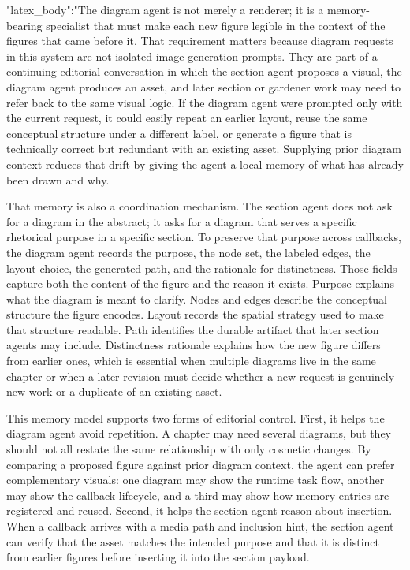 {"latex_body":"The diagram agent is not merely a renderer; it is a memory-bearing specialist that must make each new figure legible in the context of the figures that came before it. That requirement matters because diagram requests in this system are not isolated image-generation prompts. They are part of a continuing editorial conversation in which the section agent proposes a visual, the diagram agent produces an asset, and later section or gardener work may need to refer back to the same visual logic. If the diagram agent were prompted only with the current request, it could easily repeat an earlier layout, reuse the same conceptual structure under a different label, or generate a figure that is technically correct but redundant with an existing asset. Supplying prior diagram context reduces that drift by giving the agent a local memory of what has already been drawn and why.

That memory is also a coordination mechanism. The section agent does not ask for a diagram in the abstract; it asks for a diagram that serves a specific rhetorical purpose in a specific section. To preserve that purpose across callbacks, the diagram agent records the purpose, the node set, the labeled edges, the layout choice, the generated path, and the rationale for distinctness. Those fields capture both the content of the figure and the reason it exists. Purpose explains what the diagram is meant to clarify. Nodes and edges describe the conceptual structure the figure encodes. Layout records the spatial strategy used to make that structure readable. Path identifies the durable artifact that later section agents may include. Distinctness rationale explains how the new figure differs from earlier ones, which is essential when multiple diagrams live in the same chapter or when a later revision must decide whether a new request is genuinely new work or a duplicate of an existing asset.

This memory model supports two forms of editorial control. First, it helps the diagram agent avoid repetition. A chapter may need several diagrams, but they should not all restate the same relationship with only cosmetic changes. By comparing a proposed figure against prior diagram context, the agent can prefer complementary visuals: one diagram may show the runtime task flow, another may show the callback lifecycle, and a third may show how memory entries are registered and reused. Second, it helps the section agent reason about insertion. When a callback arrives with a media path and inclusion hint, the section agent can verify that the asset matches the intended purpose and that it is distinct from earlier figures before inserting it into the section payload.

}
